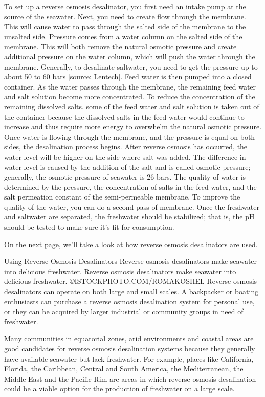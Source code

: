 To set up a reverse osmosis desalinator, you first need an intake pump at the source of the seawater.
Next, you need to create flow through the membrane. This will cause water to pass through the salted side of the membrane to the unsalted side. Pressure comes from a water column on the salted side of the membrane. This will both remove the natural osmotic pressure and create additional pressure on the water column, which will push the water through the membrane. Generally, to desalinate saltwater, you need to get the pressure up to about 50 to 60 bars [source: Lentech].
Feed water is then pumped into a closed container. As the water passes through the membrane, the remaining feed water and salt solution become more concentrated. To reduce the concentration of the remaining dissolved salts, some of the feed water and salt solution is taken out of the container because the dissolved salts in the feed water would continue to increase and thus require more energy to overwhelm the natural osmotic pressure.
Once water is flowing through the membrane, and the pressure is equal on both sides, the desalination process begins. After reverse osmosis has occurred, the water level will be higher on the side where salt was added. The difference in water level is caused by the addition of the salt and is called osmotic pressure; generally, the osmotic pressure of seawater is 26 bars. The quality of water is determined by the pressure, the concentration of salts in the feed water, and the salt permeation constant of the semi-permeable membrane. To improve the quality of the water, you can do a second pass of membrane.
Once the freshwater and saltwater are separated, the freshwater should be stabilized; that is, the pH should be tested to make sure it's fit for consumption.

On the next page, we'll take a look at how reverse osmosis desalinators are used.

 

Using Reverse Osmosis Desalinators
Reverse osmosis desalinators make seawater into delicious freshwater.
Reverse osmosis desalinators make seawater into delicious freshwater.
©ISTOCKPHOTO.COM/ROMAKOSHEL
Reverse osmosis desalinators can operate on both large and small scales. A backpacker or boating enthusiasts can purchase a reverse osmosis desalination system for personal use, or they can be acquired by larger industrial or community groups in need of freshwater.

Many communities in equatorial zones, arid environments and coastal areas are good candidates for reverse osmosis desalination systems because they generally have available seawater but lack freshwater. For example, places like California, Florida, the Caribbean, Central and South America, the Mediterranean, the Middle East and the Pacific Rim are areas in which reverse osmosis desalination could be a viable option for the production of freshwater on a large scale.

